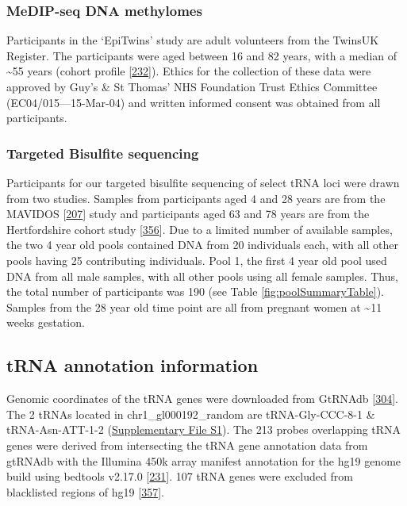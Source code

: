 \documentclass[
]{book}
\begin{document}
\hypertarget{medip-seq-dna-methylomes}{%
\subsubsection{MeDIP-seq DNA methylomes}\label{medip-seq-dna-methylomes}}

Participants in the `EpiTwins' study are adult volunteers from the TwinsUK Register.
The participants were aged between 16 and 82 years, with a median of \textasciitilde55 years (cohort profile {[}\protect\hyperlink{ref-Moayyeri2013}{232}{]}).
Ethics for the collection of these data were approved by Guy's \& St Thomas' NHS Foundation Trust Ethics Committee (EC04/015---15-Mar-04) and written informed consent was obtained from all participants.

\hypertarget{targeted-bisulfite-sequencing}{%
\subsubsection{Targeted Bisulfite sequencing}\label{targeted-bisulfite-sequencing}}

Participants for our targeted bisulfite sequencing of select tRNA loci were drawn from two studies.
Samples from participants aged 4 and 28 years are from the MAVIDOS {[}\protect\hyperlink{ref-Harvey2012a}{207}{]} study and participants aged 63 and 78 years are from the Hertfordshire cohort study {[}\protect\hyperlink{ref-Syddall2005}{356}{]}.
Due to a limited number of available samples, the two 4 year old pools contained DNA from 20 individuals each, with all other pools having 25 contributing individuals.
Pool 1, the first 4 year old pool used DNA from all male samples, with all other pools using all female samples.
Thus, the total number of participants was 190 (see Table \ref{fig:poolSummaryTable}).
Samples from the 28 year old time point are all from pregnant women at \textasciitilde11 weeks gestation.

\hypertarget{tRNAanno}{%
\subsection{tRNA annotation information}\label{tRNAanno}}

Genomic coordinates of the tRNA genes were downloaded from GtRNAdb {[}\protect\hyperlink{ref-Chan2009}{304}{]}.
The 2 tRNAs located in chr1\_gl000192\_random are tRNA-Gly-CCC-8-1 \& tRNA-Asn-ATT-1-2 (\href{Supplementary_Files/hg19-tRNAs.bed}{Supplementary File S1}).
The 213 probes overlapping tRNA genes were derived from intersecting the tRNA gene annotation data from gtRNAdb with the Illumina 450k array manifest annotation for the hg19 genome build using bedtools v2.17.0 {[}\protect\hyperlink{ref-Quinlan2010}{231}{]}.
107 tRNA genes were excluded from blacklisted regions of hg19 {[}\protect\hyperlink{ref-Amemiya2019}{357}{]}.
\end{document}
